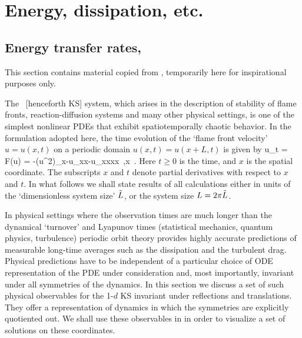 \section{Energy, dissipation, etc.}

\subsection{Energy transfer rates, \KS}
\label{sec:energy}

This section contains material copied from ,
temporarily here for inspirational purposes only.

The \KS\ [henceforth KS] system,
which arises in the description of
stability of flame fronts, reaction-diffusion systems and many other
physical settings, is one of the simplest nonlinear PDEs that
exhibit spatiotemporally chaotic behavior. In the formulation
adopted here, the time evolution of the `flame front velocity'
$u=u(x,t)$ on a periodic domain $u(x,t) = u(x+L,t)$ is given by
\beq
  u_t = F(u) = -{\textstyle{}}(u^2)_x-u_{xx}-u_{xxxx}
    \,,\qquad   x \in [-L/2,L/2]
    \,.
Here $t \geq 0$ is the time, and $x$ is the spatial coordinate.
The subscripts $x$ and $t$ denote partial derivatives with respect to
$x$ and $t$. In what follows
we shall state results of all calculations either in units of the
`dimensionless system size' $\tilde{L}$, or the system size $L = 2 \pi
\tilde{L}$.

In physical settings where the observation times are much
longer than the dynamical `turnover' and Lyapunov times
(statistical mechanics, quantum physics, turbulence) periodic
orbit theory provides highly accurate predictions
of measurable long-time averages such as the dissipation and
the turbulent drag. Physical predictions have to
be independent of a particular choice of ODE representation
of the PDE under consideration and, most importantly,
invariant under all symmetries of the dynamics. In this
section we discuss a set of such physical observables for the
1-$d$ KS invariant under reflections and translations. They
offer a representation of dynamics in which the symmetries
are explicitly quotiented out. We shall use these
{observables} in  in order to
visualize a set of solutions on these coordinates.

